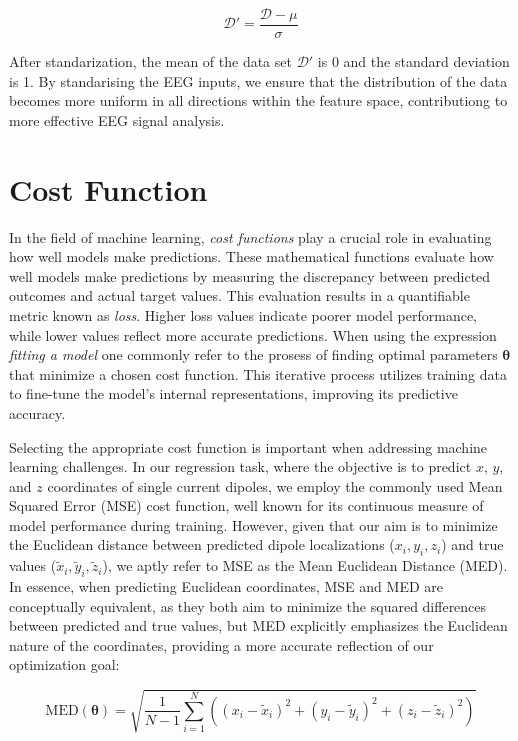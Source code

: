 \documentclass[a4paper, UKenglish, 11pt]{uiomaster}
\begin{document}
\begin{equation}
\mathcal{D}' = \frac{\mathcal{D} - \mu}{\sigma}
\end{equation}

After standarization, the mean of the data set $\mathcal{D}'$  is 0 and the standard deviation is 1. By standarising the EEG inputs, we ensure that the distribution of the data becomes more uniform in all directions within the feature space, contributiong to more effective EEG signal analysis.


\section{Cost Function}
In the field of machine learning, \emph{cost functions} play a crucial role in evaluating how well models make predictions. These mathematical functions evaluate how well models make predictions by measuring the discrepancy between predicted outcomes and actual target values. This evaluation results in a quantifiable metric known as \emph{loss}. Higher loss values indicate poorer model performance, while lower values reflect more accurate predictions. When using the expression \emph{fitting a model} one commonly refer to the prosess of finding optimal parameters $\boldsymbol{\theta}$ that minimize a chosen cost function. This iterative process utilizes training data to fine-tune the model's internal representations, improving its predictive accuracy.

Selecting the appropriate cost function is important when addressing machine learning challenges. In our regression task, where the objective is to predict $x$, $y$, and $z$ coordinates of single current dipoles, we employ the commonly used Mean Squared Error (MSE) cost function, well known for its continuous measure of model performance during training. However, given that our aim is to minimize the Euclidean distance between predicted dipole localizations (${x_i, y_i, z_i}$) and true values ($\tilde{x}_i, \tilde{y}_i, \tilde{z}_i$), we aptly refer to MSE as the Mean Euclidean Distance (MED). In essence, when predicting Euclidean coordinates, MSE and MED are conceptually equivalent, as they both aim to minimize the squared differences between predicted and true values, but MED explicitly emphasizes the Euclidean nature of the coordinates, providing a more accurate reflection of our optimization goal:

\begin{equation}
\text{MED}(\boldsymbol{\theta}) = \sqrt{\frac{1}{N-1} \sum_{i=1}^{N} \left((x_i - \tilde{x}_i)^2 + (y_i - \tilde{y}_i)^2 + (z_i - \tilde{z}_i)^2\right)}
\label{eq:MED}
\end{equation}
%
\end{document}

